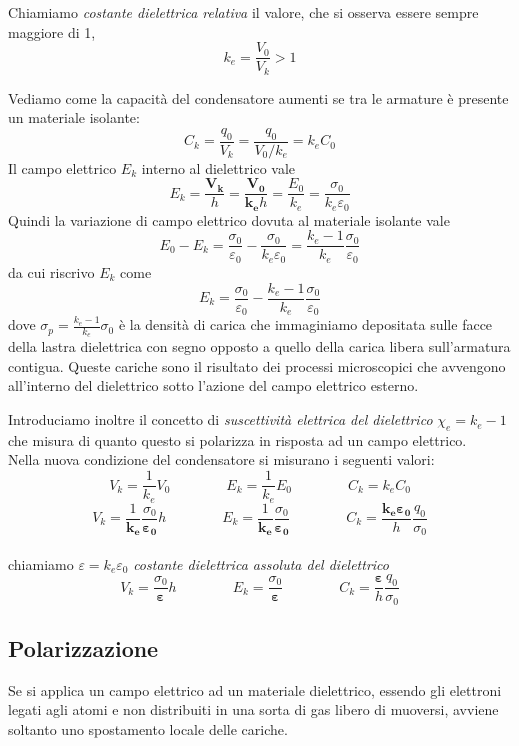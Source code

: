 \documentclass[x11names]{report}
\begin{document}
Chiamiamo \textit{costante dielettrica relativa} il valore, che si osserva essere sempre maggiore di 1,
\[
k_e = \frac{V_0}{V_k} > 1
\] 
\begin{figure}[H]
	\centering
\end{figure}
Vediamo come la capacità del condensatore aumenti se tra le armature è presente un materiale isolante:
\[
C_k = \frac{q_0}{V_k} = \frac{q_0}{V_0/k_e} = k_eC_0
\]
Il campo elettrico \(E_k\) interno al dielettrico vale
\[
E_k = \frac{\boldsymbol{V_k}}{h} = \frac{\boldsymbol{V_0}}{\boldsymbol{k_e}h} = \frac{E_0}{k_e} = \frac{\sigma_0}{k_e\varepsilon_0}
\]
Quindi la variazione di campo elettrico dovuta al materiale isolante vale
\[
E_0 - E_{k} = \frac{\sigma_0}{\varepsilon_0} -  \frac{\sigma_0}{k_e\varepsilon_0} = \frac{k_e - 1}{k_e}\frac{\sigma_0}{\varepsilon_0}
\]
da cui riscrivo \(E_k\) come 
\[
E_k = \frac{\sigma_0}{\varepsilon_0} - \frac{k_e - 1}{k_e}\frac{\sigma_0}{\varepsilon_0}
\]
dove \(\sigma_p =  \frac{k_e - 1}{k_e}\sigma_0\) è la densità di carica che immaginiamo depositata sulle facce della lastra dielettrica con segno opposto a quello della carica libera sull'armatura contigua. Queste cariche sono il risultato dei processi microscopici che avvengono all'interno del dielettrico sotto l'azione del campo elettrico esterno. 

Introduciamo inoltre il concetto di \textit{suscettività elettrica del dielettrico} \(\chi_e = k_e - 1\) che  misura di quanto questo si polarizza in risposta ad un campo elettrico. \\

\noindent
Nella nuova condizione del condensatore si misurano i seguenti valori:
\[
V_k = \frac{1}{k_e}V_0 \qquad\qquad E_k = \frac{1}{k_e}E_0 \qquad\qquad C_k = k_eC_0
\]
\[
V_k = \frac{1}{\boldsymbol{k_e}}\frac{\sigma_0}{\boldsymbol{\varepsilon_0}}h \qquad\qquad E_k = \frac{1}{\boldsymbol{k_e}}\frac{\sigma_0}{\boldsymbol{\varepsilon_0}} \qquad\qquad C_k = \frac{\boldsymbol{k_e\varepsilon_0}}{h}\frac{q_0}{\sigma_0}
\]\\
chiamiamo \(\varepsilon = k_e\varepsilon_0\) \textit{costante  dielettrica assoluta del dielettrico}
\[
V_k = \frac{\sigma_0}{\boldsymbol{\varepsilon}}h \qquad\qquad E_k = \frac{\sigma_0}{\boldsymbol{\varepsilon}} \qquad\qquad C_k = \frac{\boldsymbol{\varepsilon}}{h}\frac{q_0}{\sigma_0}
\]
\subsection{Polarizzazione}
Se si applica un campo elettrico ad un materiale dielettrico, essendo gli elettroni legati agli atomi e non distribuiti in una sorta di gas libero di muoversi, avviene soltanto uno spostamento locale delle cariche.
\end{document}
